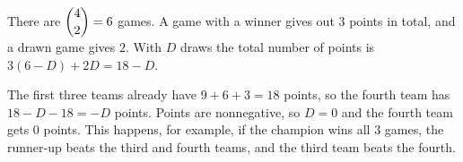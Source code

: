 There are $\dbinom42=6$ games. A game with a winner gives out $3$ points in total, and a drawn game gives $2$. With $D$ draws the total number of points is $3(6-D)+2D=18-D$.

The first three teams already have $9+6+3=18$ points, so the fourth team has $18-D-18=-D$ points. Points are nonnegative, so $D=0$ and the fourth team gets $\boxed{0}$ points. This happens, for example, if the champion wins all $3$ games, the runner-up beats the third and fourth teams, and the third team beats the fourth.
